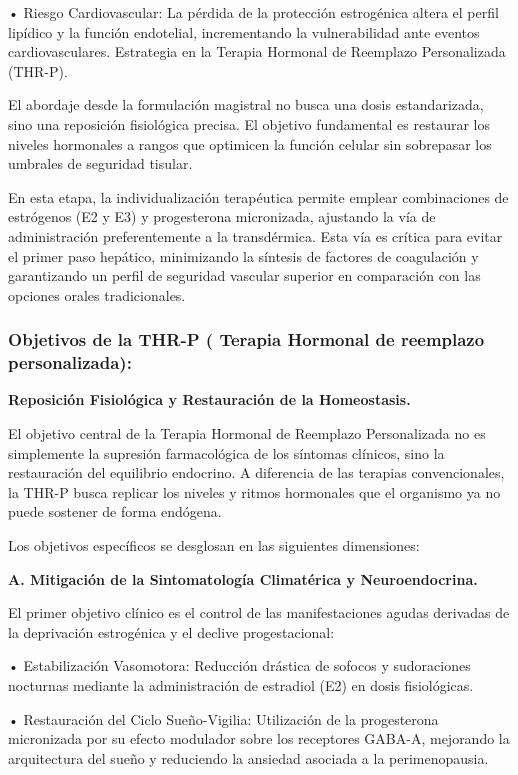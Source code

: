 \documentclass[
  spanish,
]{article}
\begin{document}
• Riesgo Cardiovascular: La pérdida de la protección estrogénica altera el perfil lipídico y la función endotelial, incrementando la vulnerabilidad ante eventos cardiovasculares.
Estrategia en la Terapia Hormonal de Reemplazo Personalizada (THR-P).

El abordaje desde la formulación magistral no busca una dosis estandarizada, sino una reposición fisiológica precisa. El objetivo fundamental es restaurar los niveles hormonales a rangos que optimicen la función celular sin sobrepasar los umbrales de seguridad tisular.

En esta etapa, la individualización terapéutica permite emplear combinaciones de estrógenos (E2 y E3) y progesterona micronizada, ajustando la vía de administración preferentemente a la transdérmica. Esta vía es crítica para evitar el primer paso hepático, minimizando la síntesis de factores de coagulación y garantizando un perfil de seguridad vascular superior en comparación con las opciones orales tradicionales.

\subsubsection{Objetivos de la THR-P ( Terapia Hormonal de reemplazo personalizada):}\label{objetivos-de-la-thr-p-terapia-hormonal-de-reemplazo-personalizada}

\textbf{Reposición Fisiológica y Restauración de la Homeostasis.}

El objetivo central de la Terapia Hormonal de Reemplazo Personalizada no es simplemente la supresión farmacológica de los síntomas clínicos, sino la restauración del equilibrio endocrino. A diferencia de las terapias convencionales, la THR-P busca replicar los niveles y ritmos hormonales que el organismo ya no puede sostener de forma endógena.

Los objetivos específicos se desglosan en las siguientes dimensiones:

\textbf{A. Mitigación de la Sintomatología Climatérica y Neuroendocrina.}

El primer objetivo clínico es el control de las manifestaciones agudas derivadas de la deprivación estrogénica y el declive progestacional:

• Estabilización Vasomotora: Reducción drástica de sofocos y sudoraciones nocturnas mediante la administración de estradiol (E2) en dosis fisiológicas.

• Restauración del Ciclo Sueño-Vigilia: Utilización de la progesterona micronizada por su efecto modulador sobre los receptores GABA-A, mejorando la arquitectura del sueño y reduciendo la ansiedad asociada a la perimenopausia.
\end{document}
